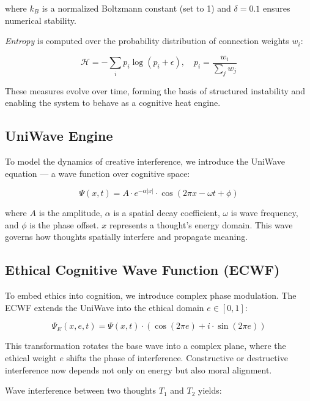 \documentclass{article}
\begin{document}
\noindent where $k_B$ is a normalized Boltzmann constant (set to 1) and $\delta = 0.1$ ensures numerical stability.

\textit{Entropy} is computed over the probability distribution of connection weights $w_i$:

\begin{equation}
\mathcal{H} = -\sum_i p_i \log (p_i + \epsilon), \quad p_i = \frac{w_i}{\sum_j w_j}
\end{equation}

These measures evolve over time, forming the basis of structured instability and enabling the system to behave as a cognitive heat engine.

\subsection{UniWave Engine}

To model the dynamics of creative interference, we introduce the UniWave equation — a wave function over cognitive space:

\begin{equation}
\Psi(x, t) = A \cdot e^{-\alpha |x|} \cdot \cos(2\pi x - \omega t + \phi)
\end{equation}

\noindent where $A$ is the amplitude, $\alpha$ is a spatial decay coefficient, $\omega$ is wave frequency, and $\phi$ is the phase offset. $x$ represents a thought’s energy domain. This wave governs how thoughts spatially interfere and propagate meaning.

\subsection{Ethical Cognitive Wave Function (ECWF)}

To embed ethics into cognition, we introduce complex phase modulation. The ECWF extends the UniWave into the ethical domain $e \in [0,1]$:

\begin{equation}
\Psi_E(x, e, t) = \Psi(x, t) \cdot \left( \cos(2\pi e) + i \cdot \sin(2\pi e) \right)
\end{equation}

\noindent This transformation rotates the base wave into a complex plane, where the ethical weight $e$ shifts the phase of interference. Constructive or destructive interference now depends not only on energy but also moral alignment.

Wave interference between two thoughts $T_1$ and $T_2$ yields:
\end{document}
